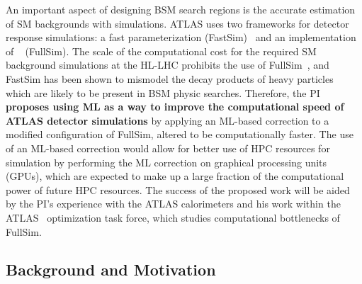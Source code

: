 \documentclass[letter, USenglish, 11pt, subfigure]{article}
\begin{document}
An important aspect of designing BSM search regions is the accurate estimation of SM backgrounds with simulations. ATLAS uses two frameworks for detector response simulations: a fast parameterization (FastSim)~\cite{ATL-SOFT-PUB-2018-002} and an implementation of \GEANT~\cite{Agostinelli:2002hh} (FullSim). The scale of the computational cost for the required SM background simulations at the HL-LHC prohibits the use of FullSim~\cite{computingCDR}, and FastSim has been shown to mismodel the decay products of heavy particles~\cite{hcw2018} which are likely to be present in BSM physic searches. Therefore, the PI {\bf proposes using ML as a way to improve the computational speed of ATLAS detector simulations} by applying an ML-based correction to a modified configuration of FullSim, altered to be computationally faster. The use of an ML-based correction would allow for better use of HPC resources for simulation by performing the ML correction on graphical processing units (GPUs), which are expected to make up a large fraction of the computational power of future HPC resources. The success of the proposed work will be aided by the PI's experience with the ATLAS calorimeters and his work within the ATLAS \GEANT\ optimization task force, which studies computational bottlenecks of FullSim. 

\clearpage

\subsection{Background and Motivation}
\end{document}
